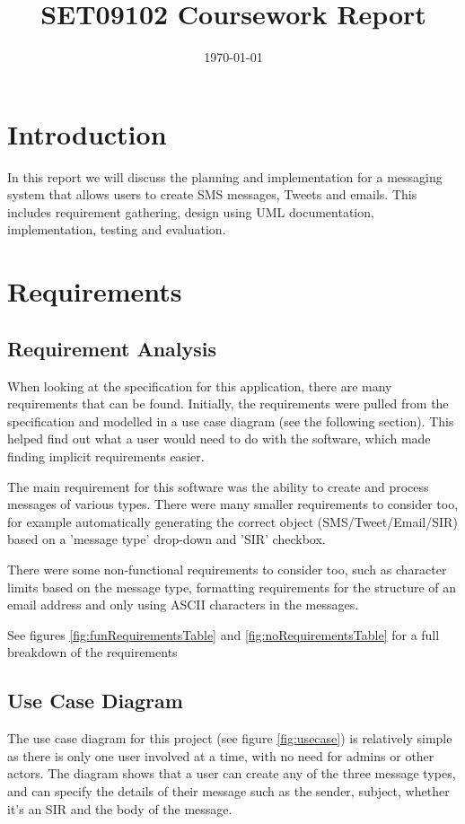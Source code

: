 \documentclass[a4paper]{article}
\title{SET09102 Coursework Report}
\date{\today}
\begin{document}
\maketitle

\section{Introduction}
\label{sec:introduction}

In this report we will discuss the planning and implementation for a messaging system that allows users to create SMS messages, Tweets and emails. This includes requirement gathering, design using UML documentation, implementation, testing and evaluation.

\section{Requirements}
\label{sec:requirements}

\subsection{Requirement Analysis}
When looking at the specification for this application, there are many requirements that can be found. Initially, the requirements were pulled from the specification and modelled in a use case diagram (see the following section). This helped find out what a user would need to do with the software, which made finding implicit requirements easier.

The main requirement for this software was the ability to create and process messages of various types. There were many smaller requirements to consider too, for example automatically generating the correct object (SMS/Tweet/Email/SIR) based on a 'message type' drop-down and 'SIR' checkbox.

There were some non-functional requirements to consider too, such as character limits based on the message type, formatting requirements for the structure of an email address and only using ASCII characters in the messages.

See figures \ref{fig:funRequirementsTable} and \ref{fig:noRequirementsTable} for a full breakdown of the requirements

\subsection{Use Case Diagram}
The use case diagram for this project (see figure \ref{fig:usecase}) is relatively simple as there is only one user involved at a time, with no need for admins or other actors. The diagram shows that a user can create any of the three message types, and can specify the details of their message such as the sender, subject, whether it's an SIR and the body of the message.
\end{document}
